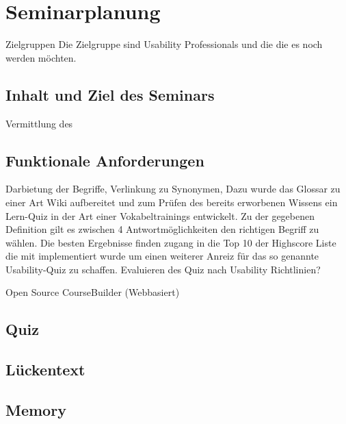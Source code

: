 \documentclass[a4paper, 12pt, twoside, BCOR=20mm, DIV=calc, abstracton, parskip=half*, toc=bibliography, toc=listof, headsepline, footsepline, headings=small, numbers=enddot]{scrreprt}
\begin{document}
	\section{Seminarplanung}
	Zielgruppen
	Die Zielgruppe sind Usability Professionals und die die es noch werden möchten. 
	\subsection{Inhalt und Ziel des Seminars}
	Vermittlung des
	\subsection{Funktionale Anforderungen}
	Darbietung der Begriffe, Verlinkung zu Synonymen, 
	Dazu wurde das Glossar zu einer Art Wiki aufbereitet und zum Prüfen des bereits erworbenen Wissens ein Lern-Quiz in der Art einer Vokabeltrainings entwickelt. Zu der gegebenen Definition gilt es zwischen 4 Antwortmöglichkeiten den richtigen Begriff zu wählen. Die besten Ergebnisse finden zugang in die Top 10 der Highscore Liste die mit implementiert wurde um einen weiterer Anreiz für das so genannte Usability-Quiz zu schaffen. 
	Evaluieren des Quiz nach Usability Richtlinien?
	
	Open Source
	CourseBuilder (Webbasiert) 
	
	\subsection{Quiz}
	\subsection{Lückentext}
	\subsection{Memory}
	
\end{document}
